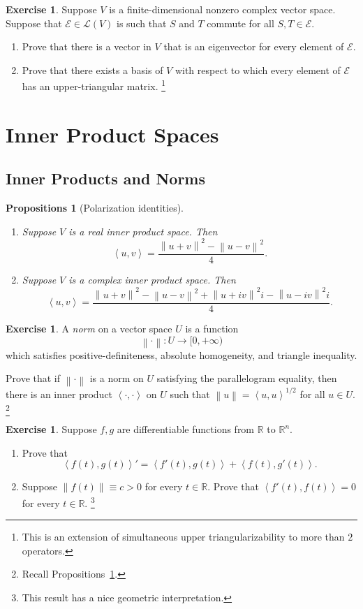 \documentclass{tufte-handout}
\theoremstyle{plain} %
\newtheorem{props}[thm]{Propositions}
\theoremstyle{definition}
\newtheorem{exer}[thm]{Exercise}
\theoremstyle{remark}
\newcommand{\norm}[1]{\left\lVert#1\right\rVert}
\newcommand{\inp}[2]{\left\langle#1,#2\right\rangle}
\newcommand{\R}{\mathbb{R}}
\renewcommand{\L}{\mathcal{L}}
\newcommand{\E}{\mathcal{E}}
\begin{document}
\begin{exer}
	Suppose $V$ is a finite-dimensional nonzero complex vector space. Suppose that $\E\in\L(V)$ is such that $S$ and $T$ commute for all $S,T\in\E$.
	\begin{enumerate}
		\item Prove that there is a vector in $V$ that is an eigenvector for every element of $\E$.
		\item Prove that there exists a basis of $V$ with respect to which every element of $\E$ has an upper-triangular matrix.%
		\footnote{This is an extension of simultaneous upper triangularizability to more than $2$ operators.}
	\end{enumerate}
\end{exer}


\section{Inner Product Spaces}
\subsection{Inner Products and Norms}
\begin{props}[Polarization identities]\label{props: polarization identities}
	\begin{enumerate}
		\item Suppose $V$ is a real inner product space. Then
		\[\inp{u}{v}=\frac{\norm{u+v}^2-\norm{u-v}^2}{4}.\]
		\item Suppose $V$ is a complex inner product space. Then
		\[\inp{u}{v}=\frac{\norm{u+v}^2-\norm{u-v}^2+\norm{u+iv}^2i-\norm{u-iv}^2i}{4}.\]
	\end{enumerate}
\end{props}

\begin{exer}
	A \emph{norm} on a vector space $U$ is a function
	\[\norm{\cdot}:U\to[0,+\infty)\]
	which satisfies positive-definiteness, absolute homogeneity, and triangle inequality.

	Prove that if $\norm{\cdot}$ is a norm on $U$ satisfying the parallelogram equality, then there is an inner product $\inp{\cdot}{\cdot}$ on $U$ such that $\norm{u}=\inp{u}{u}^{1/2}$ for all $u\in U$.%
	\footnote{Recall Propositions~\ref{props: polarization identities}.}
\end{exer}

\begin{exer}
	Suppose $f,g$ are differentiable functions from $\R$ to $\R^n$.
	\begin{enumerate}
		\item Prove that
		\[\inp{f(t)}{g(t)}'=\inp{f'(t)}{g(t)}+\inp{f(t)}{g'(t)}.\]
		\item Suppose $\norm{f(t)}\equiv c>0$ for every $t\in\R$. Prove that $\inp{f'(t)}{f(t)}=0$ for every $t\in\R$.%
		\footnote{This result has a nice geometric interpretation.}
	\end{enumerate}
\end{exer}
\end{document}
